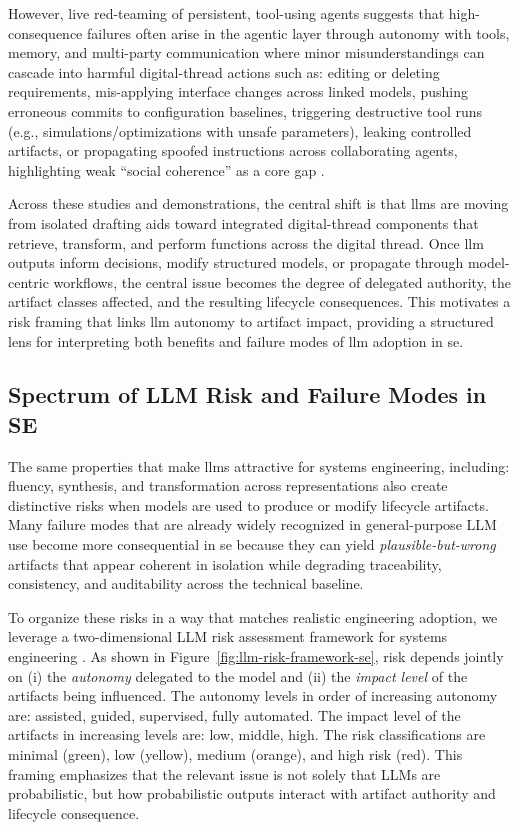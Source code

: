 However, live red-teaming of persistent, tool-using agents suggests that high-consequence failures often arise in the agentic layer through autonomy with tools, memory, and multi-party communication where minor misunderstandings can cascade into harmful digital-thread actions such as: editing or deleting requirements, mis-applying interface changes across linked models, pushing erroneous commits to configuration baselines, triggering destructive tool runs (e.g., simulations/optimizations with unsafe parameters), leaking controlled artifacts, or propagating spoofed instructions across collaborating agents, highlighting weak “social coherence” as a core gap \cite{shapira_AgentsChaos_2026}. 

Across these studies and demonstrations, the central shift is that \acp{llm} are moving from isolated drafting aids toward integrated digital-thread components that retrieve, transform, and perform functions across the digital thread. Once \ac{llm} outputs inform decisions, modify structured models, or propagate through model-centric workflows, the central issue becomes the degree of delegated authority, the artifact classes affected, and the resulting lifecycle consequences. This motivates a risk framing that links \ac{llm} autonomy to artifact impact, providing a structured lens for interpreting both benefits and failure modes of \ac{llm} adoption in \ac{se}.


\subsection{Spectrum of LLM Risk and Failure Modes in SE}
\label{subsec:ch2_llm_failure_modes}

The same properties that make \acp{llm} attractive for systems engineering, including: fluency, synthesis, and transformation across representations also create distinctive risks when models are used to produce or modify lifecycle artifacts. Many failure modes that are already widely recognized in general-purpose LLM use become more consequential in \ac{se} because they can yield \emph{plausible-but-wrong} artifacts that appear coherent in isolation while degrading traceability, consistency, and auditability across the technical baseline.

To organize these risks in a way that matches realistic engineering adoption, we leverage a two-dimensional LLM risk assessment framework for systems engineering \cite{otten_GenerativeAISystemsRiskAssessment_2026}. As shown in Figure~\ref{fig:llm-risk-framework-se}, risk depends jointly on (i) the \emph{autonomy} delegated to the model and (ii) the \emph{impact level} of the artifacts being influenced. The autonomy levels in order of increasing autonomy are: assisted, guided, supervised, fully automated. The impact level of the artifacts in increasing levels are: low, middle, high. The risk classifications are minimal (green), low (yellow), medium (orange), and high risk (red). This framing emphasizes that the relevant issue is not solely that LLMs are probabilistic, but how probabilistic outputs interact with artifact authority and lifecycle consequence.

